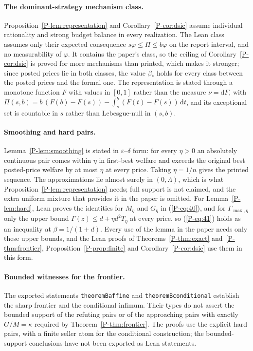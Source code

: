 \documentclass[11pt]{article}
\newcommand{\pref}[1]{\ref*{P-#1}}
\newcommand{\peqref}[1]{(\ref*{P-#1})}
\newcommand{\lean}[1]{\begingroup\def\_{\textunderscore\allowbreak}\texttt{\small #1}\endgroup}
\begin{document}
\paragraph{The dominant-strategy mechanism class.}
Proposition~\pref{lem:representation} and Corollary~\pref{cor:dsic} assume
individual rationality and strong budget balance in every realization. The
Lean class assumes only their expected consequence
$s\varphi\le\Pi\le b\varphi$ on the report interval, and no measurability of
$\varphi$. It contains the paper's class, so the ceiling of
Corollary~\pref{cor:dsic} is proved for more mechanisms than printed, which
makes it stronger; since posted prices lie in both classes, the value
$\beta_*$ holds for every class between the posted prices and the formal
one. The representation is stated through a monotone function $F$ with
values in $[0,1]$ rather than the measure $\nu=\mathrm dF$, with
$\Pi(s,b)=b\,(F(b)-F(s))-\int_s^b(F(t)-F(s))\,\mathrm dt$, and its
exceptional set is countable in $s$ rather than Lebesgue-null in $(s,b)$.

\paragraph{Smoothing and hard pairs.}
Lemma~\pref{lem:smoothing} is stated in $\varepsilon$--$\delta$ form: for
every $\eta>0$ an absolutely continuous pair comes within $\eta$ in
first-best welfare and exceeds the original best posted-price welfare by at
most $\eta$ at every price. Taking $\eta=1/n$ gives the printed sequence.
The approximations lie almost surely in $(0,\Lambda)$, which is what
Proposition~\pref{lem:representation} needs; full support is not claimed,
and the extra uniform mixture that provides it in the paper is omitted.
For Lemma~\pref{lem:hard}, Lean proves the identities for $M_\eta$ and
$G_\eta$ in \peqref{eq:40}, and for $\Gamma_{\max,\eta}$ only the upper
bound $\Gamma(z)\le d+\eta d^2T_\eta$ at every price, so \peqref{eq:41}
holds as an inequality at $\beta=1/(1+d)$. Every use of the lemma in the
paper needs only these upper bounds, and the Lean proofs of
Theorems~\pref{thm:exact} and~\pref{thm:frontier},
Proposition~\pref{prop:finite} and Corollary~\pref{cor:dsic} use them in
this form.

\paragraph{Bounded witnesses for the frontier.}
The exported statements \lean{theoremB\_affine} and
\lean{theoremB\_conditional} establish the sharp frontier and the
conditional infimum. Their types do not assert the bounded support
of the refuting pairs or of the approaching pairs with exactly
$G/M=\kappa$ required by Theorem~\pref{thm:frontier}. The proofs
use the explicit hard pairs, with a finite seller atom for the
conditional construction; the bounded-support conclusions have not
been exported as Lean statements.
\end{document}
